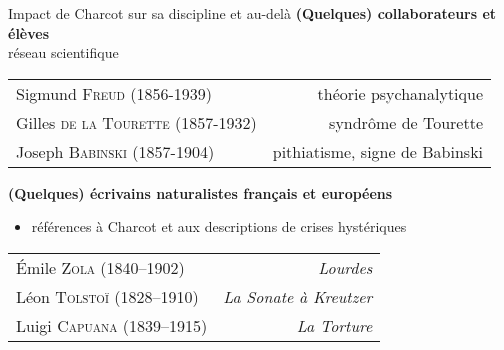 \begin{frame}{Impact de Charcot sur sa discipline et au-delà}
\centering
\textbf{(Quelques) collaborateurs et élèves}\\
{\small \og{}réseau scientifique\fg{}}
    \begin{table}[!ht]
        \centering
        \small
        \begin{tabular}{l r}
           Sigmund \textsc{Freud} (1856-1939)  & théorie psychanalytique \\
            Gilles \textsc{de la Tourette} (1857-1932) & syndrôme de Tourette \\
            Joseph \textsc{Babinski} (1857-1904) & pithiatisme, signe de Babinski \\
        \end{tabular}
        \begin{flushright}
        \footnotesize\citep{BROUSSOLLE2012301}
        \end{flushright}
        \label{tab:my_label}
    \end{table}
\medskip
\textbf{(Quelques) écrivains naturalistes français et européens} 
\begin{itemize}
\centering
\small \item références à Charcot et aux descriptions de crises hystériques
\end{itemize}
\begin{table}[!ht]
    \centering
    \small
    \begin{tabular}{l r}
        Émile \textsc{Zola} (1840–1902)  & \textit{Lourdes} \\
        Léon \textsc{Tolstoï} (1828–1910) & \textit{La Sonate à Kreutzer} \\
        Luigi \textsc{Capuana} (1839–1915) & \textit{La Torture}
    \end{tabular}
            \begin{flushright}
        \footnotesize\citep{koehler2013charcot}
        \end{flushright}
    \label{tab:my_label}
\end{table}

\end{frame}

